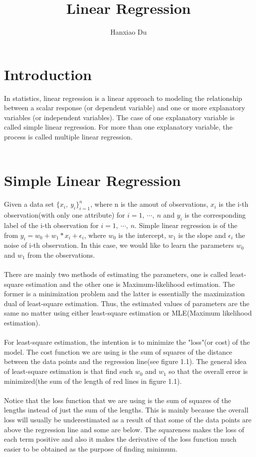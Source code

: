 \documentclass[11pt]{article}
\author{Hanxiao Du}
\title{Linear Regression}
\begin{document}
\date{}
\maketitle
\noindent
\section{Introduction}
In statistics, linear regression is a linear approach to modeling the relationship between a scalar response (or dependent variable) and one or more explanatory variables (or independent variables). The case of one explanatory variable is called simple linear regression. For more than one explanatory variable, the process is called multiple linear regression.\\
\\
\section{Simple Linear Regression}
Given a data set $\{x_i,\ y_i\}_{i=1}^n$, where n is the amout of observations, $x_i$ is the i-th observation(with only one attribute) for $i=1,\ \cdots,\ n$ and $y_i$ is the corresponding label of the i-th observation for $i=1,\ \cdots,\ n$. Simple linear regression is of the from $y_i = w_0 + w_1 * x_i + \epsilon_i$, where $w_0$ is the intercept, $w_1$ is the slope and $\epsilon_i$ the noise of i-th observation. In this case, we would like to learn the parameters $w_0$ and $w_1$ from the observations.\\
\\
There are mainly two methods of estimating the parameters, one is called least-square estimation and the other one is Maximum-likelihood estimation. The former is a minimization problem and the latter is essentially the maximization dual of least-square estimation. Thus, the estimated values of parameters are the same no matter using either least-square estimation or MLE(Maximum likelihood estimation).\\
\\
For least-square estimation, the intention is to minimize the "loss"(or cost) of the model. The cost function we are using is the sum of squares of the distance between the data points and the regression line(see figure 1.1). The general idea of least-square estimation is that find such $w_0$ and $w_1$ so that the overall error is minimized(the sum of the length of red lines in figure 1.1).\\
\\
Notice that the loss function that we are using is the sum of squares of the lengths instead of just the sum of the lengths. This is mainly because the overall loss will usually be underestimated as a result of that some of the data points are above the regression line and some are below. The squareness makes the loss of each term positive and also it makes the derivative of the loss function much easier to be obtained as the purpose of finding minimum.\\
\end{document}
